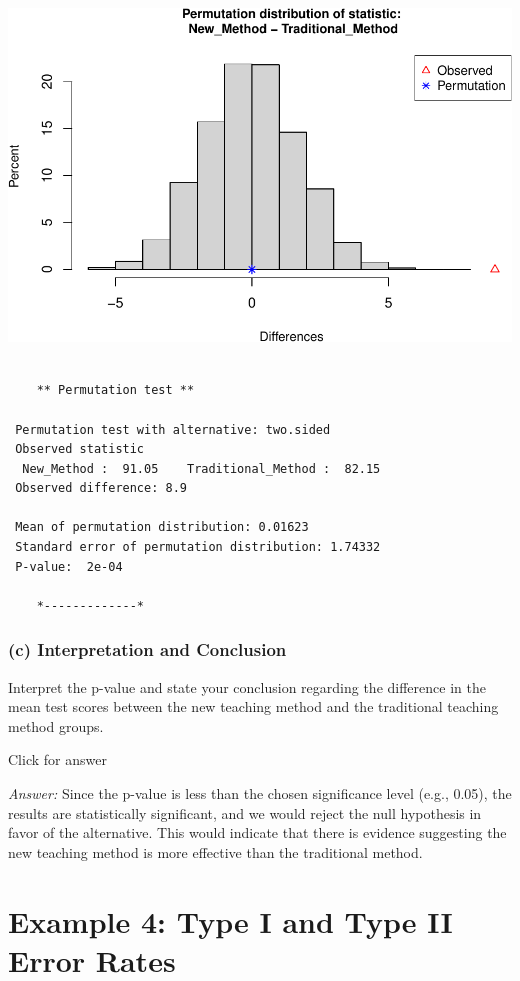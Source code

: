 \documentclass[
]{book}
\begin{document}
\includegraphics[width=1\linewidth]{Class_Activity_13_files/figure-latex/unnamed-chunk-2-1}

\begin{verbatim}

    ** Permutation test **

 Permutation test with alternative: two.sided 
 Observed statistic
  New_Method :  91.05    Traditional_Method :  82.15 
 Observed difference: 8.9 

 Mean of permutation distribution: 0.01623 
 Standard error of permutation distribution: 1.74332 
 P-value:  2e-04 

    *-------------*
\end{verbatim}

\hypertarget{c-interpretation-and-conclusion-1}{%
\subsubsection{(c) Interpretation and Conclusion}\label{c-interpretation-and-conclusion-1}}

Interpret the p-value and state your conclusion regarding the difference in the mean test scores between the new teaching method and the traditional teaching method groups.

Click for answer

\emph{Answer:} Since the p-value is less than the chosen significance level (e.g., 0.05), the results are statistically significant, and we would reject the null hypothesis in favor of the alternative. This would indicate that there is evidence suggesting the new teaching method is more effective than the traditional method.

\hypertarget{example-4-type-i-and-type-ii-error-rates}{%
\section{Example 4: Type I and Type II Error Rates}\label{example-4-type-i-and-type-ii-error-rates}}
\end{document}
